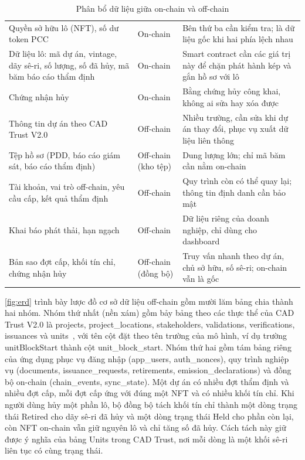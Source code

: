 \HinhOnOffChain

\begin{table}[!htbp]
    \centering
    \caption{Phân bổ dữ liệu giữa on-chain và off-chain}
    \label{tab:onoffchain}
    \small
    \begin{tabularx}{\textwidth}{|L{4.6cm}|L{2.6cm}|Y|}
        \hline
         &  &  \\
        \hline
        Quyền sở hữu lô (NFT), số dư token PCC & On-chain & Bên thứ ba cần kiểm tra; là dữ liệu gốc khi hai phía lệch nhau \\
        \hline
        Dữ liệu lô: mã dự án, vintage, dãy sê-ri, số lượng, số đã hủy, mã băm báo cáo thẩm định & On-chain & Smart contract cần các giá trị này để chặn phát hành kép và gắn hồ sơ với lô \\
        \hline
        Chứng nhận hủy & On-chain & Bằng chứng hủy công khai, không ai sửa hay xóa được \\
        \hline
        Thông tin dự án theo CAD Trust V2.0 & Off-chain & Nhiều trường, cần sửa khi dự án thay đổi, phục vụ xuất dữ liệu liên thông \\
        \hline
        Tệp hồ sơ (PDD, báo cáo giám sát, báo cáo thẩm định) & Off-chain (kho tệp) & Dung lượng lớn; chỉ mã băm cần nằm on-chain \\
        \hline
        Tài khoản, vai trò off-chain, yêu cầu cấp, kết quả thẩm định & Off-chain & Quy trình còn có thể quay lại; thông tin định danh cần bảo mật \\
        \hline
        Khai báo phát thải, hạn ngạch & Off-chain & Dữ liệu riêng của doanh nghiệp, chỉ dùng cho dashboard \\
        \hline
        Bản sao đợt cấp, khối tín chỉ, chứng nhận hủy & Off-chain (đồng bộ) & Truy vấn nhanh theo dự án, chủ sở hữu, số sê-ri; on-chain vẫn là gốc \\
        \hline
    \end{tabularx}
\end{table}

\autoref{fig:erd} trình bày lược đồ cơ sở dữ liệu off-chain gồm mười lăm bảng chia thành hai nhóm. Nhóm thứ nhất (nền xám) gồm bảy bảng theo các thực thể của CAD Trust V2.0 là projects, project\_locations, stakeholders, validations, verifications, issuances và units~\cite{cadtrust2025datamodel}, với tên cột đặt theo tên trường của mô hình, ví dụ trường unitBlockStart thành cột unit\_block\_start. Nhóm thứ hai gồm tám bảng riêng của ứng dụng phục vụ đăng nhập (app\_users, auth\_nonces), quy trình nghiệp vụ (documents, issuance\_requests, retirements, emission\_declarations) và đồng bộ on-chain (chain\_events, sync\_state). Một dự án có nhiều đợt thẩm định và nhiều đợt cấp, mỗi đợt cấp ứng với đúng một NFT và có nhiều khối tín chỉ. Khi người dùng hủy một phần lô, bộ đồng bộ tách khối tín chỉ thành một dòng trạng thái Retired cho dãy sê-ri đã hủy và một dòng trạng thái Held cho phần còn lại, còn NFT on-chain vẫn giữ nguyên lô và chỉ tăng số đã hủy. Cách tách này giữ được ý nghĩa của bảng Units trong CAD Trust, nơi mỗi dòng là một khối sê-ri liên tục có cùng trạng thái.

